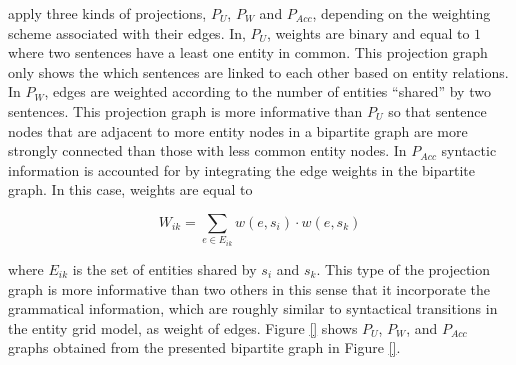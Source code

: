  apply three kinds of projections, $P_U$, $P_W$ and $P_{Acc}$, depending on
the weighting scheme associated with their edges. 
In, $P_U$, weights are binary and equal to $1$ where two sentences have a least one entity in common. 
This projection graph only shows the which sentences are linked to each other based on entity relations. 
In $P_W$, edges are weighted according to the number of entities ``shared” by two sentences. 
This projection graph is more informative than $P_U$ so that sentence nodes that are adjacent to more entity nodes in a bipartite graph are more strongly connected than those with less common entity nodes. 
In $P_{Acc}$ syntactic information is accounted for by integrating the edge weights in the bipartite graph. 
In this case, weights are equal to

\begin{equation}
W_{ik} = \sum_{e \in E_{ik}}{w(e,s_i) \cdot w(e,s_k)}
\end{equation}


where $E_{ik}$ is the set of entities shared by $s_i$ and $s_k$. 
This type of the projection graph is more informative than two others in this sense that it incorporate the grammatical information, which are roughly similar to syntactical transitions in the entity grid model, as weight of edges. 
Figure \ref{} shows $P_U$, $P_W$, and $P_{Acc}$ graphs obtained from the presented bipartite graph in Figure \ref{}.


